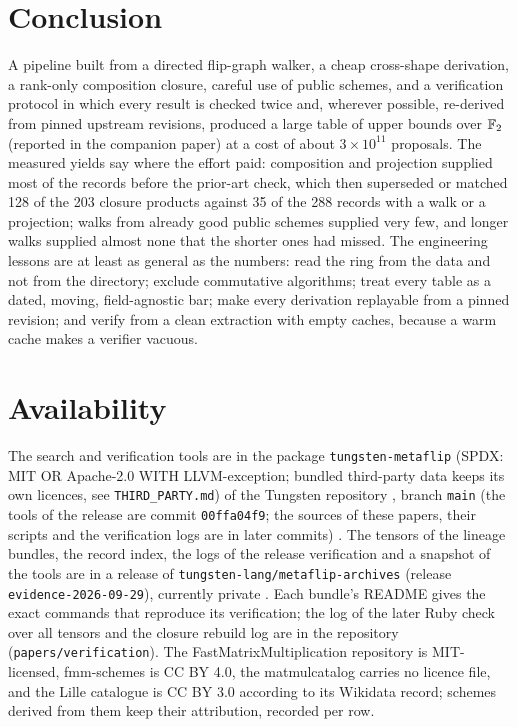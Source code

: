 \section{Conclusion}
A pipeline built from a directed flip-graph walker, a cheap cross-shape derivation, a rank-only composition closure, careful use of public schemes, and a verification protocol in which every result is checked twice and, wherever possible, re-derived from pinned upstream revisions, produced a large table of upper bounds over ${\mathbb{F}_2}$ (reported in the companion paper) at a cost of about $3\times10^{11}$ proposals.
The measured yields say where the effort paid: composition and projection supplied most of the records before the prior-art check, which then superseded or matched 128 of the 203 closure products against 35 of the 288 records with a walk or a projection; walks from already good public schemes supplied very few, and longer walks supplied almost none that the shorter ones had missed.
The engineering lessons are at least as general as the numbers: read the ring from the data and not from the directory; exclude commutative algorithms; treat every table as a dated, moving, field-agnostic bar; make every derivation replayable from a pinned revision; and verify from a clean extraction with empty caches, because a warm cache makes a verifier vacuous.

\section*{Availability}
The search and verification tools are in the package \texttt{tungsten-metaflip} (SPDX: MIT OR Apache-2.0 WITH LLVM-exception; bundled third-party data keeps its own licences, see \texttt{THIRD\_PARTY.md}) of the Tungsten repository \cite{tungsten2026lang}, branch \texttt{main} (the tools of the release are commit \texttt{00ffa04f9}; the sources of these papers, their scripts and the verification logs are in later commits) .
The tensors of the lineage bundles, the record index, the logs of the release verification and a snapshot of the tools are in a release of \texttt{tungsten-lang/metaflip-archives} (release \texttt{evidence-2026-09-29}), currently private .
Each bundle's README gives the exact commands that reproduce its verification; the log of the later Ruby check over all tensors and the closure rebuild log are in the repository (\texttt{papers/verification}).
The FastMatrixMultiplication repository is MIT-licensed, fmm-schemes is CC BY 4.0, the matmulcatalog carries no licence file, and the Lille catalogue is CC BY 3.0 according to its Wikidata record; schemes derived from them keep their attribution, recorded per row.
